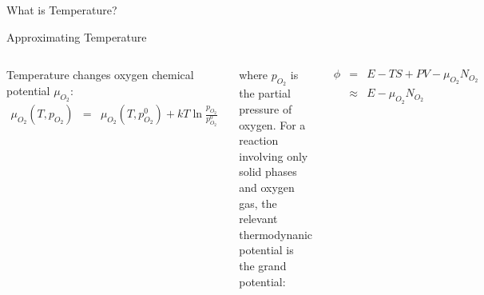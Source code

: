 \documentclass[aspectratio=169]{beamer}
\begin{document}
\begin{frame}{What is Temperature?}
\end{frame} 

\begin{frame}{Approximating Temperature}
\begin{columns}
Temperature changes oxygen chemical potential $\mu_{O_2}$:
\begin{eqnarray*}
\mu_{O_2}(T, p_{O_2}) & = & \mu_{O_2}(T, p_{O_2}^0)+ kT \ln \frac{p_{O_2}}{p_{O_2}^0}    
\end{eqnarray*} 

where $p_{O_2}$ is the partial pressure of oxygen.\newline
\newline 
For a reaction involving only solid phases and oxygen gas, the relevant thermodynanic potential is the grand potential:\cite{ongLiFeO22008}

\begin{eqnarray*}
    \phi & = & E - TS + PV - \mu_{O_2} N_{O_2}\\
    & \approx & E - \mu_{O_2} N_{O_2}
\end{eqnarray*}



\end{columns}
\end{frame}
\end{document}
